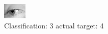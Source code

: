 \begin{figure}[h!]
\begin{center}
\includegraphics[width=0.60\columnwidth]{figures/ID2904_class_3_target_4.png}
\end{center}
\caption{ Classification: 3 actual target: 4}
\label{fig:ID2904_class_3_target_4}
\end{figure}
